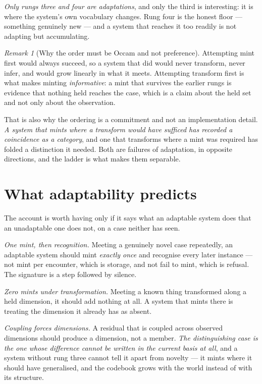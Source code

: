 \documentclass[11pt,a4paper]{article}
\theoremstyle{remark}
\newtheorem{remark}[definition]{Remark}
\begin{document}
\emph{Only rungs three and four are adaptations}, and only the third is interesting: it is where the
system's own vocabulary changes. Rung four is the honest floor --- something genuinely new --- and a
system that reaches it too readily is not adapting but accumulating.

\begin{remark}[Why the order must be Occam and not preference]\label{rem:occam}
Attempting mint first would always succeed, so a system that did would never transform, never infer,
and would grow linearly in what it meets. Attempting transform first is what makes minting
\emph{informative}: a mint that survives the earlier rungs is evidence that nothing held reaches the
case, which is a claim about the held set and not only about the observation.

That is also why the ordering is a commitment and not an implementation detail. \emph{A system that
mints where a transform would have sufficed has recorded a coincidence as a category}, and one that
transforms where a mint was required has folded a distinction it needed. Both are failures of
adaptation, in opposite directions, and the ladder is what makes them separable.
\end{remark}

\section{What adaptability predicts}\label{sec:predicts}
The account is worth having only if it says what an adaptable system does that an unadaptable one does
not, on a case neither has seen.

\emph{One mint, then recognition.} Meeting a genuinely novel case repeatedly, an adaptable system should
mint \emph{exactly once} and recognise every later instance --- not mint per encounter, which is
storage, and not fail to mint, which is refusal. The signature is a step followed by silence.

\emph{Zero mints under transformation.} Meeting a known thing transformed along a held dimension, it
should add nothing at all. A system that mints there is treating the dimension it already has as absent.

\emph{Coupling forces dimensions.} A residual that is coupled across observed dimensions should produce
a dimension, not a member. \emph{The distinguishing case is the one whose difference cannot be written
in the current basis at all}, and a system without rung three cannot tell it apart from novelty --- it
mints where it should have generalised, and the codebook grows with the world instead of with its
structure.
\end{document}
